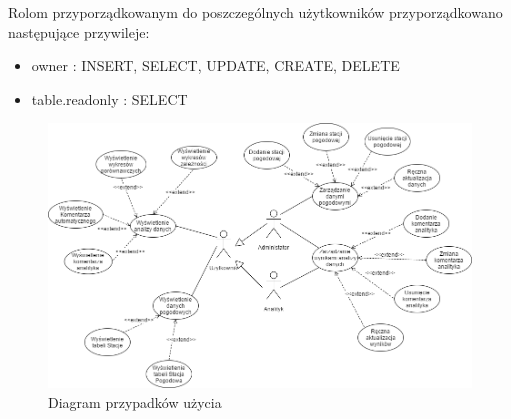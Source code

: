 \documentclass[12pt,a4paper]{article}
\begin{document}
Rolom przyporządkowanym do poszczególnych użytkowników przyporządkowano następujące przywileje:
\begin{itemize}
\item owner : INSERT, SELECT, UPDATE, CREATE, DELETE
\item table.readonly : SELECT
\end{itemize}

\begin{figure}[!htb]
\includegraphics[width=\textwidth]{./figures/DiagramPrzypadkowUzycia.png}
\caption{Diagram przypadków użycia}
\end{figure}
 
\end{document}
